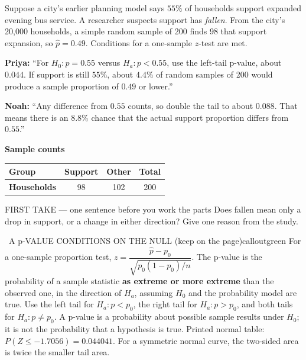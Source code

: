 \documentclass[11pt]{article}
\begin{document}
Suppose a city's earlier planning model says $55\%$ of households support expanded evening bus service. A researcher suspects support has \emph{fallen}. From the city's 20{,}000 households, a simple random sample of 200 finds 98 that support expansion, so $\hat p=0.49$. Conditions for a one-sample $z$-test are met.\par\smallskip \textbf{Priya:} ``For $H_0:p=0.55$ versus $H_a:p<0.55$, use the left-tail p-value, about $0.044$. If support is still $55\%$, about $4.4\%$ of random samples of 200 would produce a sample proportion of $0.49$ or lower.''\par \textbf{Noah:} ``Any difference from $0.55$ counts, so double the tail to about $0.088$. That means there is an $8.8\%$ chance that the actual support proportion differs from $0.55$.''\par
\begin{center}
\textbf{Sample counts}\par\smallskip
\begin{tabular}{|l|c|c|c|}
\hline
\textbf{Group} & \textbf{Support} & \textbf{Other} & \textbf{Total} \\ \hline
\textbf{Households} & 98 & 102 & 200 \\ \hline
\end{tabular}
\end{center}
\begin{firsttakebox}{FIRST TAKE --- one sentence before you work the parts}
Does fallen mean only a drop in support, or a change in either direction? Give one reason from the study.\par
{}
\end{firsttakebox}

\begin{callout}{\IconBook\ A p-VALUE CONDITIONS ON THE NULL (keep on the page)}{calloutgreen}
For a one-sample proportion test,
$z=\dfrac{\hat p-p_0}{\sqrt{p_0(1-p_0)/n}}$.
The p-value is the probability of a sample statistic \textbf{as extreme or more extreme} than the observed one,
in the direction of $H_a$, assuming $H_0$ and the probability model are true. Use the left tail for $H_a:p<p_0$,
the right tail for $H_a:p>p_0$, and both tails for $H_a:p\neq p_0$.
A p-value is a probability about possible sample results under $H_0$; it is not the probability that a hypothesis is true.
Printed normal table: $P(Z\leq-1.7056)=0.044041$. For a symmetric normal curve, the two-sided area is twice the smaller tail area.
\end{callout}
\end{document}
